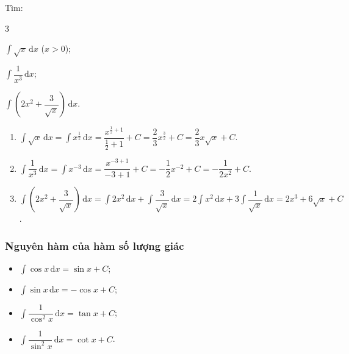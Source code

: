 \documentclass[12pt,aspectratio=169]{beamer}
\begin{document}
\begin{vd}
	Tìm:
	\begin{enumEX}{3}
		\item $\displaystyle\int \sqrt{x}\mathrm{\,d}x$ ($x>0$);
		\item $\displaystyle\int \dfrac{1}{x^3}\mathrm{\,d}x$;
		\item $\displaystyle\int \left(2x^2+\dfrac{3}{\sqrt{x}}\right)\mathrm{\,d}x$.
	\end{enumEX}

	\begin{loigiai}
		\begin{enumerate}
			\item $\displaystyle\int \sqrt{x}\mathrm{\,d}x = \displaystyle\int x^{\tfrac{1}{2}}\mathrm{\,d}x = \dfrac{x^{\tfrac{1}{2}+1}}{\frac{1}{2}+1} + C = \dfrac{2}{3}x^{\tfrac{3}{2}} + C = \dfrac{2}{3}x\sqrt{x}+C$.
			\item $\displaystyle\int \dfrac{1}{x^3}\mathrm{\,d}x = \displaystyle\int x^{-3}\mathrm{\,d}x = \dfrac{x^{-3+1}}{-3+1} + C = -\dfrac{1}{2}x^{-2} + C = -\dfrac{1}{2x^2}+C$.
			\item $\displaystyle\int \left(2x^2+\dfrac{3}{\sqrt{x}}\right)\mathrm{\,d}x = \displaystyle\int 2x^2\mathrm{\,d}x + \displaystyle\int \dfrac{3}{\sqrt{x}}\mathrm{\,d}x = 2\displaystyle\int x^2\mathrm{\,d}x + 3\displaystyle\int \dfrac{1}{\sqrt{x}} \mathrm{\,d}x = 2x^3 + 6\sqrt{x} + C$.
		\end{enumerate}
	\end{loigiai}
\end{vd}

\subsubsection{Nguyên hàm của hàm số lượng giác}

\begin{tomtat}
	\begin{dl}
		\begin{itemize}
			\item $\displaystyle\int \cos x\mathrm{\,d}x = \sin x + C$;
			\item $\displaystyle\int \sin x\mathrm{\,d}x = -\cos x + C$;
			\item $\displaystyle\int \dfrac{1}{\cos^2 x}\mathrm{\,d}x = \tan x + C$;
			\item $\displaystyle\int \dfrac{1}{\sin^2 x}\mathrm{\,d}x = \cot x + C$.
		\end{itemize}
	\end{dl}
\end{tomtat}
\end{document}

